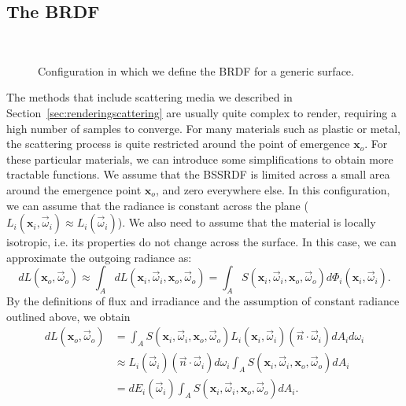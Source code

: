 \subsection{The BRDF}
\begin{figure}
\centering
   \def\svgwidth{0.8\textwidth}
    \\
\caption{Configuration in which we define the BRDF for a generic surface.} %
\label{fig:brdf_configuration}
\end{figure}

The methods that include scattering media we described in Section~\ref{sec:renderingscattering} are usually quite complex to render, requiring a high number of samples to converge. For many materials such as plastic or metal, the scattering process  is quite restricted around the point of emergence $\mathbf{x}_o$. For these particular materials, we can introduce some simplifications to obtain more tractable functions. We assume that the BSSRDF is limited across a small area around the emergence point $\mathbf{x}_o$, and zero everywhere else. In this configuration, we can assume that the radiance is constant across the plane ($L_i(\mathbf{x}_i, \vec{\omega}_i) \approx L_i(\vec{\omega}_i)$). We also need to assume that the material is locally isotropic, i.e. its properties do not change across the surface. In this case, we can approximate the outgoing radiance as:
\begin{equation*}
d L(\mathbf{x}_o, \vec{\omega}_o) \approx \int_A d L(\mathbf{x}_i, \vec{\omega}_i, \mathbf{x}_o, \vec{\omega}_o) = \int_A S(\mathbf{x}_i, \vec{\omega}_i, \mathbf{x}_o, \vec{\omega}_o) d \Phi_i(\mathbf{x}_i, \vec{\omega}_i).
\end{equation*}
By the definitions of flux and irradiance and the assumption of constant radiance outlined above, we obtain 
\begin{equation*}
\begin{split}
d L(\mathbf{x}_o, \vec{\omega}_o) &= \int_A S(\mathbf{x}_i, \vec{\omega}_i, \mathbf{x}_o, \vec{\omega}_o) L_i(\mathbf{x}_i, \vec{\omega}_i) (\vec{n} \cdot \vec{\omega}_i) d A_i d \omega_i  \\ &\approx L_i(\vec{\omega}_i) (\vec{n} \cdot \vec{\omega}_i) d \omega_i \int_A S(\mathbf{x}_i, \vec{\omega}_i, \mathbf{x}_o, \vec{\omega}_o)   d A_i \\ &= d E_i(\vec{\omega}_i) \int_A S(\mathbf{x}_i, \vec{\omega}_i, \mathbf{x}_o, \vec{\omega}_o) d A_i.
\end{split}
\end{equation*}
